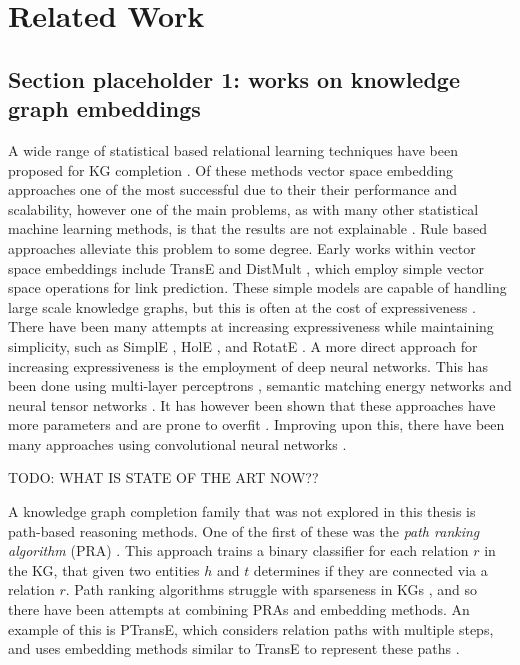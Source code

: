 \chapter{Related Work}
\section{Section placeholder 1: works on knowledge graph embeddings}

A wide range of statistical based relational learning techniques have been proposed for KG completion \cite{nickel2015review}. Of these methods vector space embedding approaches one of the most successful due to their 
their performance and scalability, however one of the main problems, as with many other statistical machine learning methods, is that the results are not explainable \cite{bonatti2019knowledge}. Rule based approaches alleviate this problem to some degree. Early works within vector space embeddings include TransE \cite{TransE} and DistMult \cite{yang2014embedding}, which employ simple vector space operations for link prediction. These simple models are capable of handling large scale knowledge graphs, but this is often at the cost of expressiveness \cite{dettmers2018convolutional}. There have been many attempts at increasing expressiveness while maintaining simplicity, such as SimplE \cite{SimplE}, HolE \cite{holE}, and RotatE \cite{rotatE}. A more direct approach for increasing expressiveness is the employment of deep neural networks. This has been done using multi-layer perceptrons \cite{dong2014knowledge}, semantic matching energy networks \cite{bordes2014semantic} and neural tensor networks \cite{socher2013reasoning}. It has however been shown that these approaches have more parameters and are prone to overfit \cite{nickel2015review}. Improving upon this, there have been many approaches using convolutional neural networks \cite{dettmers2018convolutional, nguyen2017novel, jiang2019adaptive}.

TODO: WHAT IS STATE OF THE ART NOW??


A knowledge graph completion family that was not explored in this thesis is path-based reasoning methods. One of the first of these was the \textit{path ranking algorithm} (PRA) \cite{lao2011random}. This approach trains a binary classifier for each relation $r$ in the KG, that given two entities $h$ and $t$ determines if they are connected via a relation $r$. Path ranking algorithms struggle with sparseness in KGs \cite{ma2019elpkg}, and so there have been attempts at combining PRAs and embedding methods. An example of this is PTransE, which considers relation paths with multiple steps, and uses embedding methods similar to TransE to represent these paths \cite{lin2015modeling}. 


